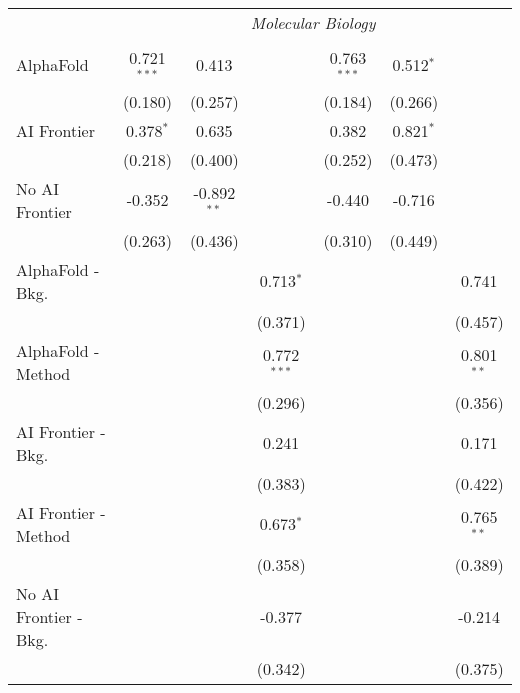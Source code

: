 \begin{tabular}{lcccccc}
 & \multicolumn{6}{c}{\textit{Molecular Biology}} \\ \\
   AlphaFold               & 0.721$^{***}$ & 0.413         &               & 0.763$^{***}$ & 0.512$^{*}$ &   \\   
                           & (0.180)       & (0.257)       &               & (0.184)       & (0.266)     &   \\   
   AI Frontier             & 0.378$^{*}$   & 0.635         &               & 0.382         & 0.821$^{*}$ &   \\   
                           & (0.218)       & (0.400)       &               & (0.252)       & (0.473)     &   \\   
   No AI Frontier          & -0.352        & -0.892$^{**}$ &               & -0.440        & -0.716      &   \\   
                           & (0.263)       & (0.436)       &               & (0.310)       & (0.449)     &   \\   
   AlphaFold - Bkg.        &               &               & 0.713$^{*}$   &               &             & 0.741\\   
                           &               &               & (0.371)       &               &             & (0.457)\\   
   AlphaFold - Method      &               &               & 0.772$^{***}$ &               &             & 0.801$^{**}$\\   
                           &               &               & (0.296)       &               &             & (0.356)\\   
   AI Frontier - Bkg.      &               &               & 0.241         &               &             & 0.171\\   
                           &               &               & (0.383)       &               &             & (0.422)\\   
   AI Frontier - Method    &               &               & 0.673$^{*}$   &               &             & 0.765$^{**}$\\   
                           &               &               & (0.358)       &               &             & (0.389)\\   
   No AI Frontier - Bkg.   &               &               & -0.377        &               &             & -0.214\\   
                           &               &               & (0.342)       &               &             & (0.375)\\   

\end{tabular}
